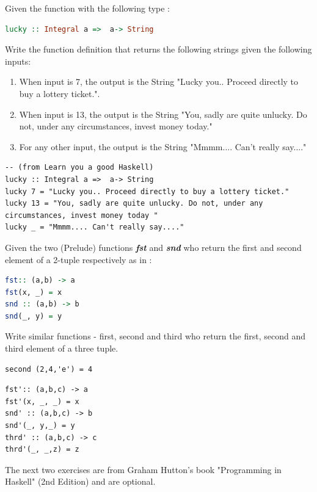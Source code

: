 \documentclass{article}
\begin{document}
\pagebreak
\begin{exercise} 


Given the function with the following type :
\begin{lstlisting}[language=Haskell]
 lucky :: Integral a =>  a-> String
\end{lstlisting}
Write the function definition that returns the following strings given the following inputs:
\begin{enumerate}
 \item When input is 7, the output is the String "Lucky you.. Proceed directly to buy a lottery ticket.".
 \item When input is 13, the output is the String "You, sadly are quite unlucky. Do not, under any circumstances, invest money today."
 \item For any other input, the output is the String "Mmmm.... Can't really say...."
 \end{enumerate}
\end{exercise}

\begin{solution}
\begin{lstlisting}
-- (from Learn you a good Haskell)
lucky :: Integral a =>  a-> String
lucky 7 = "Lucky you.. Proceed directly to buy a lottery ticket."
lucky 13 = "You, sadly are quite unlucky. Do not, under any circumstances, invest money today "
lucky _ = "Mmmm.... Can't really say...."
\end{lstlisting}
\end{solution}
\pagebreak
\begin{exercise}
 Given the two (Prelude) functions \textbf{\textit{fst}} and \textbf{\textit{snd}} who return the first and second element of a 2-tuple respectively as in : 
\begin{lstlisting}[language=Haskell]
fst:: (a,b) -> a
fst(x, _) = x
snd :: (a,b) -> b
snd(_, y) = y
\end{lstlisting}
Write similar functions  - first, second and third who return the first, second and third element of a three tuple. 
\begin{lstlisting}
second (2,4,'e') = 4
\end{lstlisting}
\end{exercise}
\begin{solution}
\begin{lstlisting}
fst':: (a,b,c) -> a
fst'(x, _, _) = x
snd' :: (a,b,c) -> b
snd'(_, y,_) = y
thrd' :: (a,b,c) -> c
thrd'(_, _,z) = z
\end{lstlisting}
\end{solution}
\pagebreak
The next two exercises are from Graham Hutton's book "Programming in Haskell" (2nd Edition) and are optional.
\end{document}
